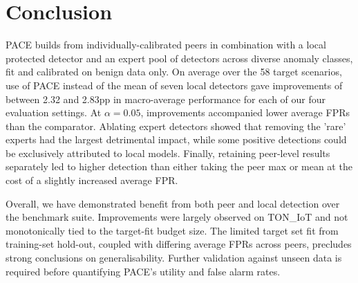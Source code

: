 \section{Conclusion} 
PACE builds from individually-calibrated peers in combination with a local protected detector and an expert pool of detectors across diverse anomaly classes, fit and calibrated on benign data only. On average over the 58 target scenarios, use of PACE instead of the mean of seven local detectors gave improvements of between 2.32 and 2.83pp in macro-average performance for each of our four evaluation settings. At $\alpha=0.05$, improvements accompanied lower average FPRs than the comparator. Ablating expert detectors showed that removing the 'rare' experts had the largest detrimental impact, while some positive detections could be exclusively attributed to local models. Finally, retaining peer-level results separately led to higher detection than either taking the peer max or mean at the cost of a slightly increased average FPR.

Overall, we have demonstrated benefit from both peer and local detection over the benchmark suite. Improvements were largely observed on TON\_IoT and not monotonically tied to the target-fit budget size. The limited target set fit from training-set hold-out, coupled with differing average FPRs across peers, precludes strong conclusions on generalisability. Further validation against unseen data is required before quantifying PACE's utility and false alarm rates.
